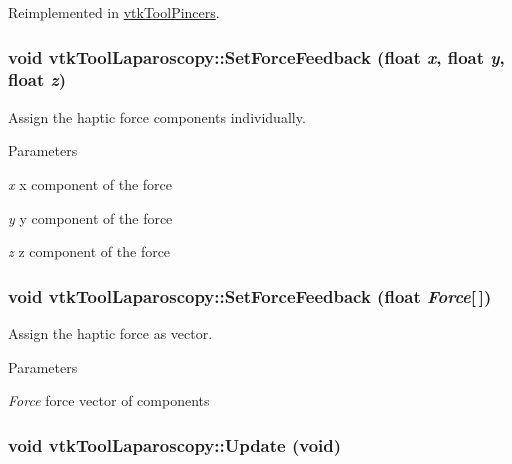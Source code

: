 Reimplemented in \hyperlink{classvtkToolPincers_ad7a4a9f0e3291b88eb4e30986784539a}{vtkToolPincers}.\hypertarget{classvtkToolLaparoscopy_aa716d470104640646068eaa160a7adf2}{
\subsubsection[{SetForceFeedback}]{\setlength{\rightskip}{0pt plus 5cm}void vtkToolLaparoscopy::SetForceFeedback (float {\em x}, \/  float {\em y}, \/  float {\em z})}}
\label{classvtkToolLaparoscopy_aa716d470104640646068eaa160a7adf2}


Assign the haptic force components individually. 
\begin{DoxyParams}{Parameters}
\item[{\em x}]x component of the force \item[{\em y}]y component of the force \item[{\em z}]z component of the force \end{DoxyParams}
\hypertarget{classvtkToolLaparoscopy_a9bbfa040ca224472e6c669a3c27d9977}{
\subsubsection[{SetForceFeedback}]{\setlength{\rightskip}{0pt plus 5cm}void vtkToolLaparoscopy::SetForceFeedback (float {\em Force}\mbox{[}$\,$\mbox{]})}}
\label{classvtkToolLaparoscopy_a9bbfa040ca224472e6c669a3c27d9977}


Assign the haptic force as vector. 
\begin{DoxyParams}{Parameters}
\item[{\em Force}]force vector of components \end{DoxyParams}
\hypertarget{classvtkToolLaparoscopy_a4445a0cfabd77b50a06929b04cb71f9e}{
\subsubsection[{Update}]{\setlength{\rightskip}{0pt plus 5cm}void vtkToolLaparoscopy::Update (void)}}
\label{classvtkToolLaparoscopy_a4445a0cfabd77b50a06929b04cb71f9e}


